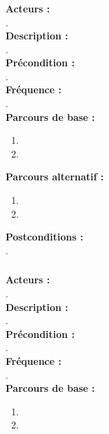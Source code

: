 \documentclass[../rapport.tex]{subfiles}
\begin{document}
\subsubsection{}

\textbf{Acteurs :} \\
. \\

\textbf{Description :} \\
. \\

\textbf{Précondition :} \\
. \\

\textbf{Fréquence :} \\
. \\

\textbf{Parcours de base :} \\
\begin{enumerate}
    \item 
    \item 
\end{enumerate}
\bigskip

\textbf{Parcours alternatif :}
\begin{enumerate}
    \item 
    \item 
\end{enumerate}

\textbf{Postconditions :} \\
. \\



\subsubsection{}

\textbf{Acteurs :} \\
. \\

\textbf{Description :} \\
. \\

\textbf{Précondition :} \\
. \\

\textbf{Fréquence :} \\
. \\

\textbf{Parcours de base :} \\
\begin{enumerate}
    \item 
    \item 
\end{enumerate}
\bigskip
\end{document}
